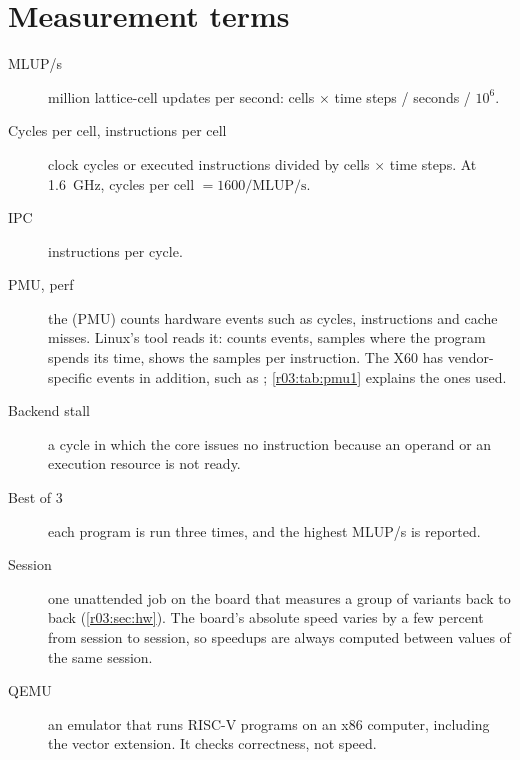 \section{Measurement terms}\label{r03:sec:bg-measure}

\begin{description}
  \item[MLUP/s] million lattice-cell updates per second: cells $\times$ time steps / seconds /
        $10^6$.
  \item[Cycles per cell, instructions per cell] clock cycles or executed instructions divided
        by cells $\times$ time steps. At 1.6~GHz, cycles per cell $= 1600 / \text{MLUP/s}$.
  \item[IPC] instructions per cycle.
  \item[PMU, perf] the  (PMU) counts hardware events such as
        cycles, instructions and cache misses. Linux's  tool reads it:
         counts events,  samples where the program spends
        its time,  shows the samples per instruction. The X60 has
        vendor-specific events in addition, such as ; \cref{r03:tab:pmu1}
        explains the ones used.
  \item[Backend stall] a cycle in which the core issues no instruction because an operand or an
        execution resource is not ready.
  \item[Best of 3] each program is run three times, and the highest MLUP/s is reported.
  \item[Session] one unattended job on the board that measures a group of variants back to back
        (\cref{r03:sec:hw}). The board's absolute speed varies by a few percent from session to
        session, so speedups are always computed between values of the same session.
  \item[QEMU] an emulator that runs RISC-V programs on an x86 computer, including the vector
        extension. It checks correctness, not speed.
\end{description}
